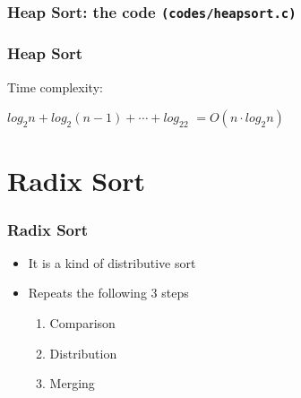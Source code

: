 \documentclass[newPxFont,sthlmFooter,nooffset]{beamer}
\begin{document}
\begin{frame}
  \frametitle{Heap Sort: the code \texttt{(codes/heapsort.c)}}
    
\end{frame}

\begin{frame}[t]
  \frametitle{Heap Sort}
Time complexity:

$log_2n + log_2(n-1) + \cdots + log_22$
$=O(n\cdot log_2n)$
\end{frame}


\section{Radix Sort}
\begin{frame}[t]
  \frametitle{Radix Sort}
  \begin{itemize}
  \item It is a kind of distributive sort
  \item Repeats the following 3 steps
    \begin{enumerate}
    \item Comparison
    \item Distribution
    \item Merging
    \end{enumerate}

  \end{itemize}
\end{frame}
\end{document}
